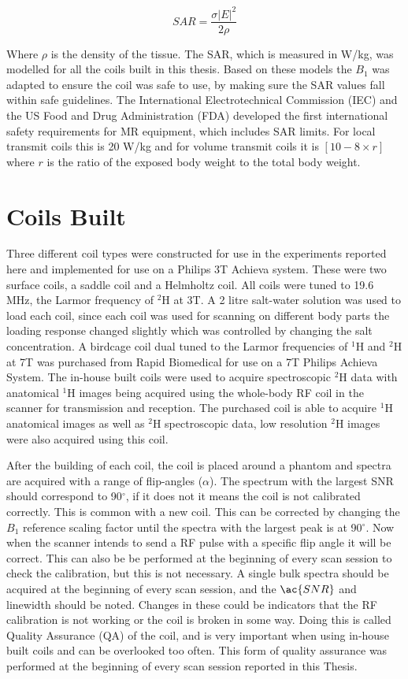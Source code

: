 \begin{equation}
    SAR = \frac{\sigma|E|^2}{2\rho}
\end{equation}

Where $\rho$ is the density of the tissue. The \ac{SAR}, which is measured in W/kg, was modelled for all the coils built in this thesis. Based on these models the $B_1$ was adapted to ensure the coil was safe to use, by making sure the \ac{SAR} values fall within safe guidelines. The International Electrotechnical Commission (IEC) and the US Food and Drug Administration (FDA) developed the first international safety requirements for MR equipment, which includes \ac{SAR} limits. For local transmit coils this is 20 W/kg and for volume transmit coils it is $[10 - 8\times r]$ where $r$ is the ratio of the exposed body weight to the total body weight.

\section{Coils Built}

Three different coil types were constructed for use in the experiments reported here and implemented for use on a Philips 3T Achieva system. These were two surface coils, a saddle coil and a Helmholtz coil. All coils were tuned to 19.6 MHz, the Larmor frequency of $^2$H at 3T. A 2 litre salt-water solution was used to load each coil, since each coil was used for scanning on different body parts the loading response changed slightly which was controlled by changing the salt concentration. A birdcage coil dual tuned to the Larmor frequencies of $^1$H and $^2$H at 7T was purchased from Rapid Biomedical for use on a 7T Philips Achieva System. The in-house built coils were used to acquire spectroscopic $^2$H data with anatomical $^1$H images being acquired using the whole-body \ac{RF} coil in the scanner for transmission and reception. The purchased coil is able to acquire $^1$H anatomical images as well as $^2$H spectroscopic data, low resolution $^2$H images were also acquired using this coil.

After the building of each coil, the coil is placed around a phantom and spectra are acquired with a range of flip-angles ($\alpha$). The spectrum with the largest \ac{SNR} should correspond to 90$^\circ$, if it does not it means the coil is not calibrated correctly. This is common with a new coil. This can be corrected by changing the $B_1$ reference scaling factor until the spectra with the largest peak is at 90$^\circ$. Now when the scanner intends to send a \ac{RF} pulse with a specific flip angle it will be correct. This can also be be performed at the beginning of every scan session to check the calibration, but this is not necessary. A single bulk spectra should be acquired at the beginning of every scan session,  and  the $\ac{SNR}$ and linewidth should be noted. Changes in these could be indicators that the \ac{RF} calibration is not working or the coil is broken in some way. Doing this is called Quality Assurance (QA) of the coil, and is very important when using in-house built coils and can be overlooked too often. This form of quality assurance was performed at the beginning of every scan session reported in this Thesis.

